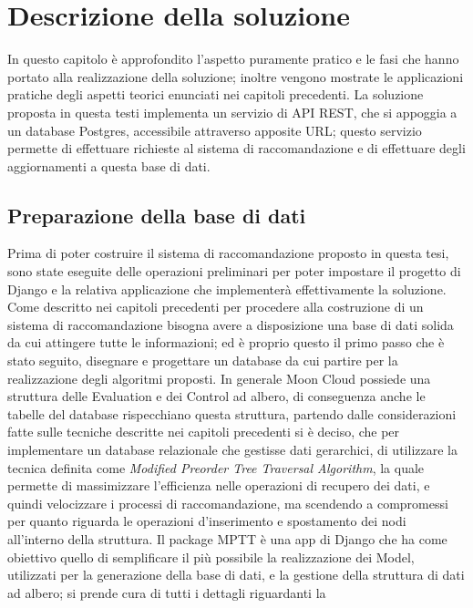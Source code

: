 \chapter{Descrizione della soluzione}\label{chp:04-solution}
In questo capitolo è approfondito l'aspetto puramente pratico e le fasi che hanno portato alla realizzazione della soluzione; 
inoltre vengono mostrate le applicazioni pratiche degli aspetti teorici enunciati nei capitoli precedenti.
%
\vspace{1.5 cm}
\hfill\break
La soluzione proposta in questa testi implementa un servizio di API REST, che si appoggia a un database Postgres, accessibile 
attraverso apposite URL; questo servizio permette di effettuare richieste al sistema di raccomandazione e di effettuare degli 
aggiornamenti a questa base di dati.
%
\section*{Preparazione della base di dati}
Prima di poter costruire il sistema di raccomandazione proposto in questa tesi, sono state eseguite delle operazioni preliminari 
per poter impostare il progetto di Django e la relativa applicazione che implementerà effettivamente la soluzione. 
Come descritto nei capitoli precedenti per procedere alla costruzione di un sistema di raccomandazione bisogna avere a disposizione 
una base di dati solida da cui attingere tutte le informazioni; ed è proprio questo il primo passo che è stato seguito, disegnare 
e progettare un database da cui partire per la realizzazione degli algoritmi proposti.
In generale Moon Cloud possiede una struttura delle Evaluation e dei Control ad albero, di conseguenza anche le tabelle del database 
rispecchiano questa struttura, partendo dalle considerazioni fatte sulle tecniche descritte nei capitoli precedenti si è deciso, che 
per implementare un database relazionale che gestisse dati gerarchici, di utilizzare la tecnica
definita come \textit{Modified Preorder Tree Traversal Algorithm}, la quale permette di massimizzare l'efficienza nelle 
operazioni di recupero dei dati, e quindi velocizzare i processi di raccomandazione, ma scendendo a compromessi per quanto riguarda le 
operazioni d'inserimento e spostamento dei nodi all'interno della struttura. 
Il package MPTT è una app di Django che ha come obiettivo quello di semplificare il più possibile la realizzazione dei Model, utilizzati 
per la generazione della base di dati, e la gestione della struttura di dati ad albero; si prende cura di tutti i dettagli riguardanti la 
